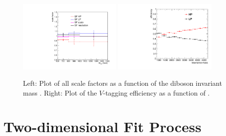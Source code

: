 \begin{figure}[htbp]
  \centering
  \includegraphics[width=0.45\textwidth]{fig/analysis/MVVDepSummary.pdf}
  \includegraphics[width=0.45\textwidth]{fig/analysis/ptDep.pdf}
  \caption{
    Left: Plot of all scale factors as a function of the diboson invariant mass \MVV.
    Right: Plot of the $V$-tagging efficiency as a function of \MVV.
  }
  \label{fig:VTag_massdep_summary}
\end{figure}

\section{Two-dimensional Fit Process}
\label{sec:2Dfit}

